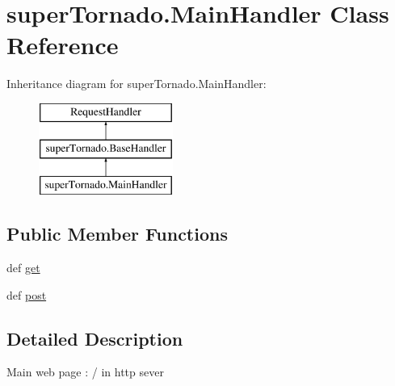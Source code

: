 \hypertarget{classsuper_tornado_1_1_main_handler}{\section{super\-Tornado.\-Main\-Handler Class Reference}
\label{classsuper_tornado_1_1_main_handler}
}
Inheritance diagram for super\-Tornado.\-Main\-Handler\-:\begin{figure}[H]
\begin{center}
\leavevmode
\includegraphics[height=3.000000cm]{classsuper_tornado_1_1_main_handler}
\end{center}
\end{figure}
\subsection*{Public Member Functions}
\begin{DoxyCompactItemize}
\item 
def \hyperlink{classsuper_tornado_1_1_main_handler_aa07ddde9b0a5bd006a055858ffef03cd}{get}
\item 
def \hyperlink{classsuper_tornado_1_1_main_handler_a34b9f9761f25b951e452954252e82deb}{post}
\end{DoxyCompactItemize}


\subsection{Detailed Description}
\begin{DoxyVerb}Main web page : / in http sever
\end{DoxyVerb}
 

